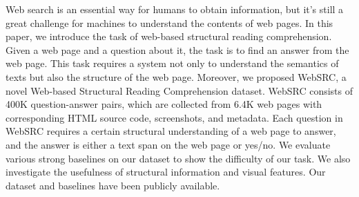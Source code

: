 Web search is an essential way for humans to obtain information, but it's still a great challenge for machines to understand the contents of web pages. In this paper, we introduce the task of web-based structural reading comprehension. Given a web page and a question about it, the task is to find an answer from the web page. This task requires a system not only to understand the semantics of texts but also the structure of the web page. Moreover, we proposed WebSRC, a novel Web-based Structural Reading Comprehension dataset. WebSRC consists of  400K question-answer pairs, which are collected from 6.4K web pages with corresponding HTML source code, screenshots, and metadata. Each question in WebSRC requires a certain structural understanding of a web page to answer, and the answer is either a text span on the web page or yes/no. We evaluate various strong baselines on our dataset to show the difficulty of our task. We also investigate the usefulness of structural information and visual features. Our dataset and baselines have been publicly available.

